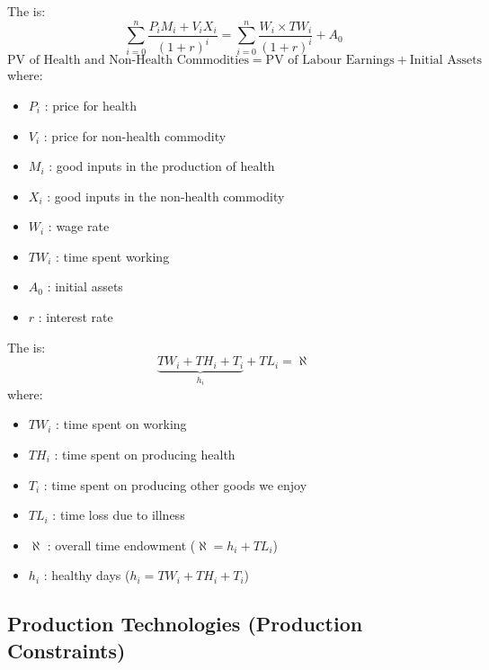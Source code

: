         The  is:
        \begin{equation*}
            \sum_{i=0}^n\frac{P_iM_i+V_iX_i}{(1+r)^i}=\sum_{i=0}^n\frac{W_i \times TW_i}{(1+r)^i}+ A_0
        \end{equation*}
        \begin{equation*}
            \text{PV of Health and Non-Health Commodities} = \text{PV of Labour Earnings} + \text{Initial Assets}
        \end{equation*}
        where:
        \begin{itemize}
            \item $P_i$ : price for health
            \item $V_i$ : price for non-health commodity
            \item $M_i$ : good inputs in the production of health
            \item $X_i$ : good inputs in the non-health commodity
            \item $W_i$ : wage rate
            \item $TW_i$ : time spent working 
            \item $A_0$ : initial assets
            \item $r$ : interest rate
        \end{itemize}
        The  is:
        \begin{equation*}
            \underbrace{TW_i+TH_i+T_i}_{h_i} +TL_i= \aleph
        \end{equation*}
        where:
        \begin{itemize}
            \item $TW_i$ : time spent on working
            \item $TH_i$ : time spent on producing health
            \item $T_i$ : time spent on producing other goods we enjoy
            \item $TL_i$ : time loss due to illness
            \item  $\aleph$  : overall time endowment ($\aleph = h_i + TL_i$)
            \item $h_i$ : healthy days ($h_i=TW_i+TH_i+T_i$)
        \end{itemize}    
    
    \subsection{Production Technologies (Production Constraints)}\label{sec:health_tech_cons}
    
